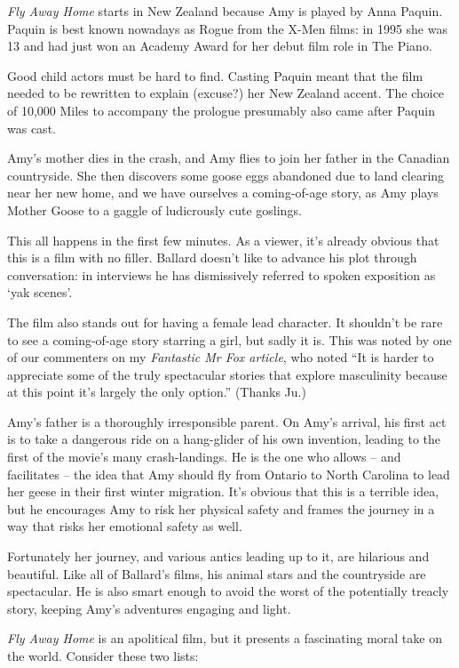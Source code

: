 \textit{Fly Away Home} starts in New Zealand because Amy is played by Anna Paquin. Paquin is best known nowadays as Rogue from the X-Men films: in 1995 she was 13 and had just won an Academy Award for her debut film role in The Piano.

Good child actors must be hard to find. Casting Paquin meant that the film needed to be rewritten to explain (excuse?) her New Zealand accent. The choice of 10,000 Miles to accompany the prologue presumably also came after Paquin was cast.

Amy's mother dies in the crash, and Amy flies to join her father in the Canadian countryside. She then discovers some goose eggs abandoned due to land clearing near her new home, and we have ourselves a coming-of-age story, as Amy plays Mother Goose to a gaggle of ludicrously cute goslings.

This all happens in the first few minutes. As a viewer, it's already obvious that this is a film with no filler. Ballard doesn't like to advance his plot through conversation: in interviews he has dismissively referred to spoken exposition as `yak scenes'.

The film also stands out for having a female lead character. It shouldn't be rare to see a coming-of-age story starring a girl, but sadly it is. This was noted by one of our commenters on my \textit{Fantastic Mr Fox article}, who noted ``It is harder to appreciate some of the truly spectacular stories that explore masculinity because at this point it's largely the only option.'' (Thanks Ju.)

Amy's father is a thoroughly irresponsible parent. On Amy's arrival, his first act is to take a dangerous ride on a hang-glider of his own invention, leading to the first of the movie's many crash-landings. He is the one who allows -- and facilitates -- the idea that Amy should fly from Ontario to North Carolina to lead her geese in their first winter migration. It's obvious that this is a terrible idea, but he encourages Amy to risk her physical safety and frames the journey in a way that risks her emotional safety as well.

Fortunately her journey, and various antics leading up to it, are hilarious and beautiful. Like all of Ballard's films, his animal stars and the countryside are spectacular. He is also smart enough to avoid the worst of the potentially treacly story, keeping Amy's adventures engaging and light.

\textit{Fly Away Home} is an apolitical film, but it presents a fascinating moral take on the world. Consider these two lists:

